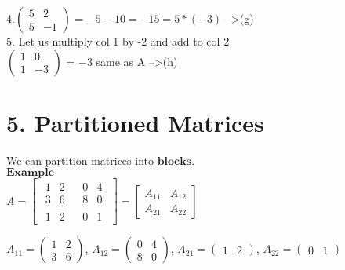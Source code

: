 \documentclass[]{article}
\begin{document}
4.\(\begin{pmatrix} 5 & 2 \\ 5 & -1 \end{pmatrix}\) =
\(-5-10=-15=5*(-3)\) --\textgreater{}(g)\\[2\baselineskip] 5. Let us
multiply col 1 by -2 and add to col 2\\[2\baselineskip]
\(\begin{pmatrix} 1 & 0 \\ 1 & -3 \end{pmatrix}\) = \(-3\) same as
\textbar{}A\textbar{} --\textgreater{}(h)\\

\section{\texorpdfstring{5. Partitioned Matrices\\
}{5. Partitioned Matrices }}\label{partitioned-matrices}

We can partition matrices into \(\textbf{blocks}\).\\

\(\mathbf{Example}\)\\

\(A=\left[\begin{array}{c|c}\begin{matrix} 1 & 2 \\ 3 & 6 \end{matrix} & \begin{matrix} 0 & 4 \\ 8 & 0 \end{matrix} \\ \hline \begin{matrix} 1 & 2 \end{matrix} & \begin{matrix} 0 & 1\end{matrix} \end{array} \right]=\left[\begin{array}{c|c}A_{11} & A_{12} \\ \hline A_{21} & A_{22} \end{array} \right]\)

\(A_{11}=\begin{pmatrix} 1 & 2 \\ 3 & 6 \end{pmatrix}\),
\(A_{12}=\begin{pmatrix} 0 & 4 \\ 8 & 0 \end{pmatrix}\),
\(A_{21}= \begin{pmatrix} 1 & 2\end{pmatrix}\),
\(A_{22}= \begin{pmatrix} 0 & 1\end{pmatrix}\)\\
\end{document}
